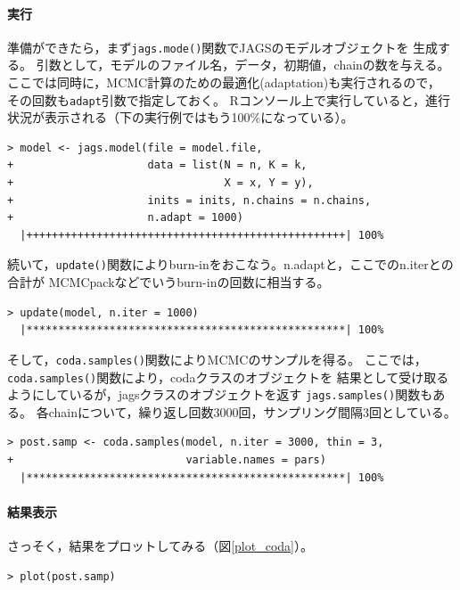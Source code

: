 \documentclass[11pt,uplatex]{jsarticle}
\begin{document}
\paragraph{実行}

準備ができたら，まず\texttt{jags.mode()}関数でJAGSのモデルオブジェクトを
生成する。
引数として，モデルのファイル名，データ，初期値，chainの数を与える。
ここでは同時に，MCMC計算のための最適化(adaptation)も実行されるので，
その回数も\texttt{adapt}引数で指定しておく。
Rコンソール上で実行していると，進行状況が表示される（下の実行例ではもう100\%になっている）。

\begin{lstlisting}
> model <- jags.model(file = model.file,
+                     data = list(N = n, K = k,
+                                 X = x, Y = y),
+                     inits = inits, n.chains = n.chains,
+                     n.adapt = 1000)
  |++++++++++++++++++++++++++++++++++++++++++++++++++| 100%
\end{lstlisting}

続いて，\texttt{update()}関数によりburn-inをおこなう。n.adaptと，ここでのn.iterとの合計が
MCMCpackなどでいうburn-inの回数に相当する。

\begin{lstlisting}
> update(model, n.iter = 1000)
  |**************************************************| 100%
\end{lstlisting}

そして，\texttt{coda.samples()}関数によりMCMCのサンプルを得る。
ここでは，\texttt{coda.samples()}関数により，\textsf{coda}クラスのオブジェクトを
結果として受け取るようにしているが，\textsf{jags}クラスのオブジェクトを返す
\texttt{jags.samples()}関数もある。
各chainについて，繰り返し回数3000回，サンプリング間隔3回としている。

\begin{lstlisting}
> post.samp <- coda.samples(model, n.iter = 3000, thin = 3,
+                           variable.names = pars)
  |**************************************************| 100%
\end{lstlisting}


\paragraph{結果表示}

さっそく，結果をプロットしてみる（図\ref{plot_coda}）。
\begin{lstlisting}
> plot(post.samp)
\end{lstlisting}
\end{document}
